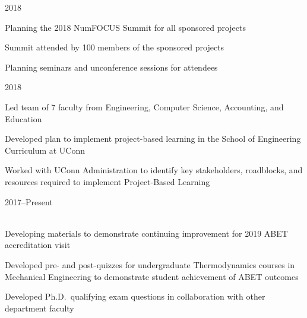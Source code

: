 \begin{lonelist}
    \item[]  \hfill 2018\\
    \begin{innerlist}
        \item Planning the 2018 NumFOCUS Summit for all sponsored projects
        \item Summit attended by 100 members of the sponsored projects
        \item Planning seminars and unconference sessions for attendees
    \end{innerlist}

    \item[]  \hfill 2018\\

    \begin{innerlist}
        \item Led team of 7 faculty from Engineering, Computer Science, Accounting, and Education
        \item Developed plan to implement project-based learning in the School of Engineering Curriculum at UConn
        \item Worked with UConn Administration to identify key stakeholders, roadblocks, and resources required to implement Project-Based Learning
    \end{innerlist}

    \item[]  \hfill 2017--Present\\
    \\

    \begin{innerlist}
        \item Developing materials to demonstrate continuing improvement for 2019 ABET accreditation visit
        \item Developed pre- and post-quizzes for undergraduate Thermodynamics courses in Mechanical Engineering to demonstrate student achievement of ABET outcomes
        \item Developed Ph.D.\ qualifying exam questions in collaboration with other department faculty
    \end{innerlist}


\end{lonelist}
